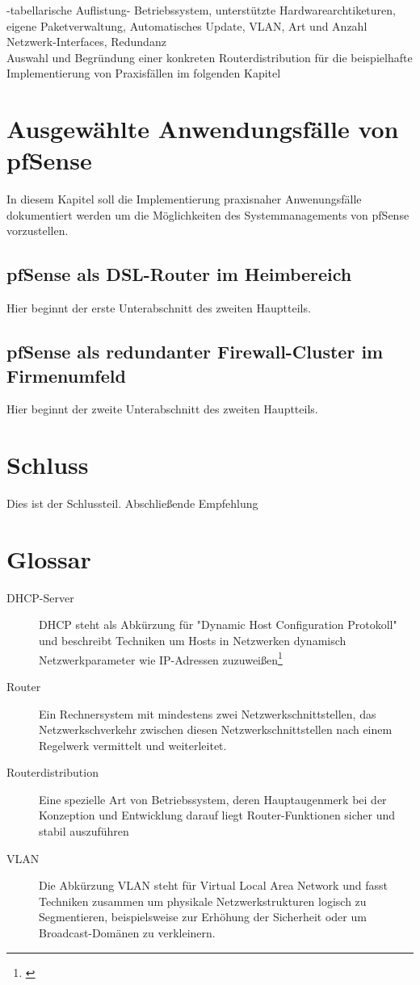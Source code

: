 \documentclass[a4paper,12pt]{scrartcl}
\begin{document}
-tabellarische Auflistung-
Betriebssystem, unterst\"utzte Hardwarearchtiketuren, eigene Paketverwaltung,
Automatisches Update, VLAN, Art und Anzahl Netzwerk-Interfaces, Redundanz\\


Auswahl und Begr\"undung einer konkreten Routerdistribution f\"ur die
beispielhafte Implementierung von Praxisf\"allen im folgenden Kapitel

\section{Ausgew\"ahlte Anwendungsf\"alle von pfSense}
In diesem Kapitel soll die Implementierung praxisnaher Anwenungsf\"alle
dokumentiert werden um die M\"oglichkeiten des Systemmanagements von pfSense
vorzustellen. 

\subsection{pfSense als DSL-Router im Heimbereich}
Hier beginnt der erste Unterabschnitt des zweiten Hauptteils.

\subsection{pfSense als redundanter Firewall-Cluster im Firmenumfeld}
Hier beginnt der zweite Unterabschnitt des zweiten Hauptteils.


\section{Schluss}
Dies ist der Schlussteil. Abschlie\ss{}ende Empfehlung
\clearpage

\section{Glossar}
\begin{description}
 \item[DHCP-Server] DHCP steht als Abk\"urzung f\"ur "Dynamic Host
Configuration Protokoll" und beschreibt Techniken um Hosts in Netzwerken
dynamisch Netzwerkparameter wie IP-Adressen zuzuwei\ss{}en\footnote{\cite{dhcp}}
 \item[Router] Ein Rechnersystem mit mindestens zwei Netzwerkschnittstellen,
das Netzwerkschverkehr zwischen diesen Netzwerkschnittstellen nach einem
Regelwerk vermittelt und weiterleitet.
 \item[Routerdistribution] Eine spezielle Art von Betriebssystem, deren
Hauptaugenmerk bei der Konzeption und Entwicklung darauf liegt
Router-Funktionen sicher und stabil auszuf\"uhren
 \item[VLAN] Die Abk\"urzung VLAN steht f\"ur Virtual Local Area Network und
fasst Techniken zusammen um physikale Netzwerkstrukturen logisch zu
Segmentieren, beispielsweise zur Erh\"ohung der Sicherheit oder um
Broadcast-Dom\"anen zu verkleinern.
\end{description}
\clearpage
\end{document}

